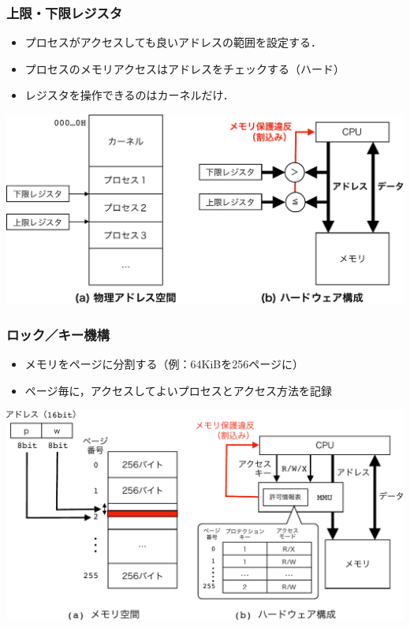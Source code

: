 \documentclass{beamer}                   %
\begin{document}
\begin{frame}
  \frametitle{上限・下限レジスタ}
  \begin{itemize}
    \item プロセスがアクセスしても良いアドレスの範囲を設定する．
    \item プロセスのメモリアクセスはアドレスをチェックする（ハード）
    \item レジスタを操作できるのはカーネルだけ．
  \end{itemize}
  \begin{center}
    \includegraphics[scale=0.60]{Fig/baseLimitRegister-crop.pdf}\\
  \end{center}
\end{frame}

\begin{frame}
  \frametitle{ロック／キー機構}
  \begin{itemize}
    \item メモリをページに分割する（例：64KiBを256ページに）
    \item ページ毎に，アクセスしてよいプロセスとアクセス方法を記録
  \end{itemize}
  \begin{center}
    \includegraphics[scale=0.60]{Fig/lockKey-crop.pdf}\\
  \end{center}
\end{frame}
\end{document}
